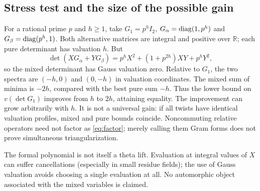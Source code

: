 \documentclass[11pt,a4paper]{article}
\begin{document}
\subsection{Stress test and the size of the possible gain}
For a rational prime $p$ and $h\geq1$, take $G_1=p^h I_2$, $G_\alpha=\operatorname{diag}(1,p^h)$ and $G_\beta=\operatorname{diag}(p^h,1)$. Both alternative matrices are integral and positive over $\mathbb R$; each pure determinant has valuation $h$. But
\begin{equation}\label{eq:mixexample}
\det(XG_\alpha+YG_\beta)=p^h X^2+(1+p^{2h})XY+p^hY^2,
\end{equation}
so the mixed determinant has Gauss valuation zero. Relative to $G_1$, the two spectra are $(-h,0)$ and $(0,-h)$ in valuation coordinates. The mixed sum of minima is $-2h$, compared with the best pure sum $-h$. Thus the lower bound on $v(\det G_1)$ improves from $h$ to $2h$, attaining equality. The improvement can grow arbitrarily with $h$. It is not a universal gain: if all twists have identical valuation profiles, mixed and pure bounds coincide. Noncommuting relative operators need not factor as \eqref{eq:factor}; merely calling them Gram forms does not prove simultaneous triangularization.

\begin{center}
\end{center}
The formal polynomial is not itself a theta lift. Evaluation at integral values of $X$ can suffer cancellations (especially in small residue fields); the use of Gauss valuation avoids choosing a single evaluation at all. No automorphic object associated with the mixed variables is claimed.
\end{document}
